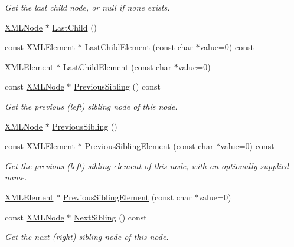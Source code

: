 \begin{DoxyCompactItemize}
\begin{DoxyCompactList}\small\item\em Get the last child node, or null if none exists. \end{DoxyCompactList}\item 
\hyperlink{classtinyxml2_1_1_x_m_l_node}{X\+M\+L\+Node} $\ast$ \hyperlink{classtinyxml2_1_1_x_m_l_node_ad7552c8cb1dc0cb6f3bdc14a9d115dbf}{Last\+Child} ()
\item 
const \hyperlink{classtinyxml2_1_1_x_m_l_element}{X\+M\+L\+Element} $\ast$ \hyperlink{classtinyxml2_1_1_x_m_l_node_a1a46cc01ece2216acf1e6294d1aff79d}{Last\+Child\+Element} (const char $\ast$value=0) const 
\item 
\hyperlink{classtinyxml2_1_1_x_m_l_element}{X\+M\+L\+Element} $\ast$ \hyperlink{classtinyxml2_1_1_x_m_l_node_a125423acf3170b130634638c5afc0639}{Last\+Child\+Element} (const char $\ast$value=0)
\item 
const \hyperlink{classtinyxml2_1_1_x_m_l_node}{X\+M\+L\+Node} $\ast$ \hyperlink{classtinyxml2_1_1_x_m_l_node_a4cb1bf63e9de55129d21a7be60685fd4}{Previous\+Sibling} () const 
\begin{DoxyCompactList}\small\item\em Get the previous (left) sibling node of this node. \end{DoxyCompactList}\item 
\hyperlink{classtinyxml2_1_1_x_m_l_node}{X\+M\+L\+Node} $\ast$ \hyperlink{classtinyxml2_1_1_x_m_l_node_ae760e5e7e766df1d2cf3bb4a847876d6}{Previous\+Sibling} ()
\item 
const \hyperlink{classtinyxml2_1_1_x_m_l_element}{X\+M\+L\+Element} $\ast$ \hyperlink{classtinyxml2_1_1_x_m_l_node_a573b2559c41dce244d893d610fbe0bd9}{Previous\+Sibling\+Element} (const char $\ast$value=0) const 
\begin{DoxyCompactList}\small\item\em Get the previous (left) sibling element of this node, with an optionally supplied name. \end{DoxyCompactList}\item 
\hyperlink{classtinyxml2_1_1_x_m_l_element}{X\+M\+L\+Element} $\ast$ \hyperlink{classtinyxml2_1_1_x_m_l_node_ae9177fdc49cb89879f333581d5f734f1}{Previous\+Sibling\+Element} (const char $\ast$value=0)
\item 
const \hyperlink{classtinyxml2_1_1_x_m_l_node}{X\+M\+L\+Node} $\ast$ \hyperlink{classtinyxml2_1_1_x_m_l_node_abba1df37581d89dccc45acdc55750ba2}{Next\+Sibling} () const 
\begin{DoxyCompactList}\small\item\em Get the next (right) sibling node of this node. \end{DoxyCompactList}\item 

\end{DoxyCompactItemize}
